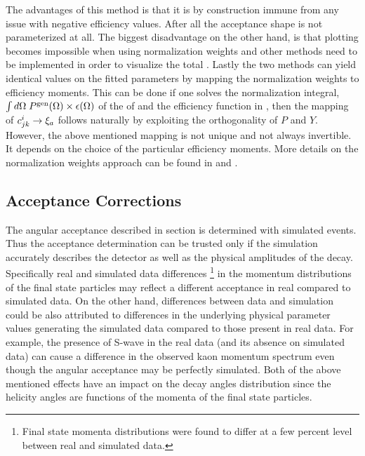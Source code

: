 The advantages of this method is that it is by construction immune from any issue with negative efficiency values.
After all the acceptance shape is not parameterized at all. The biggest disadvantage on the other hand, is that plotting becomes impossible
when using normalization weights and other methods need to be implemented in order to visualize the total \pdf.
Lastly the two methods can yield identical values on the
fitted parameters by mapping the normalization weights to efficiency moments. This can be done if one solves the normalization integral,
$\int d\Omega\;{P^{\text{gen}}(\Omega)}\times\epsilon(\Omega)$ of the \pdf of  and the efficiency function in ,
then the mapping of $c^{i}_{jk} \rightarrow \xi_a$ follows naturally by exploiting the orthogonality of $P$ and $Y$.
However, the above mentioned mapping is not unique and not always invertible. It depends on the choice of the particular
efficiency moments. More details on the normalization weights approach can be found in \cite{jeroenThesis} and \cite{tristanThesis}.

\subsection{Acceptance Corrections}
\label{Accceptance_Corrections}
The angular acceptance described in section  is determined with simulated \BsJpsiKst events.
Thus the acceptance determination can be trusted only if the simulation accurately describes the detector as well as the
physical amplitudes of the \BsJpsiKst decay. Specifically real and simulated data differences
\footnote{Final state momenta distributions were found to differ at a few percent level between real and
simulated data.} in the momentum distributions of the final state particles may reflect a different acceptance
in real compared to simulated data. On the other hand, differences between data and simulation could be also attributed to
differences in the underlying physical parameter values generating the simulated data compared to those
present in real data. For example, the presence of S-wave in the real data (and its absence on simulated data)
can cause a difference in the observed kaon momentum spectrum even though the angular acceptance may be perfectly simulated.
Both of the above mentioned effects have an impact on the decay angles distribution since the helicity angles are functions
of the momenta of the final state particles.

